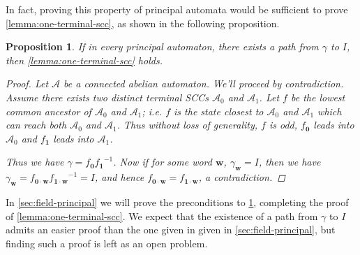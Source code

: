 \documentclass[12pt, letterpaper]{article}
\newcommand{\A}{\mathcal A}
\newcommand{\ch}[1]{\mathbf{#1}}
\newcommand{\res}[2]{{{#1}_{\ch{#2}}}}
\newtheorem{prop}[thm]{Proposition}
\begin{document}
In fact, proving this property of principal automata would be sufficient to
prove \cref{lemma:one-terminal-scc}, as shown in the following proposition.
\begin{prop}\label{prop:path-exist-gamma-delta}
    If in every principal automaton, there exists a path from $\gamma$ to
    $I$, then \cref{lemma:one-terminal-scc} holds.
    \begin{proof}
        Let $\A$ be a connected abelian automaton. We'll proceed by
        contradiction. Assume there exists two distinct terminal SCCs
        $\A_0$ and $\A_1$. Let $f$ be the lowest common ancestor of
        $\A_0$ and $\A_1$; i.e. $f$ is the state closest to $\A_0$ and
        $\A_1$ which can reach both $\A_0$ and $\A_1$. Thus without
        loss of generality, $f$ is odd, $\res{f}{0}$ leads into $\A_0$ and
        $\res{f}{1}$ leads into $\A_1$.
        \begin{center}
        \end{center}
        Thus we have $\gamma = \res{f}{0} \res{f}{1}^{-1}$.  Now if for some
        word $\ch{w}$, $\res{\gamma}{w} = I$, then we have $
        \res{\gamma}{w} = \res{f}{0 \cdot w} \res{f}{1 \cdot w}^{-1} = I$, and
        hence $\res{f}{0 \cdot w} = \res{f}{1 \cdot w}$, a contradiction.
    \end{proof}
\end{prop}

In \cref{sec:field-principal} we will prove the preconditions to
\cref{prop:path-exist-gamma-delta}, completing the proof of
\cref{lemma:one-terminal-scc}. We expect that the existence of a path from
$\gamma$ to $I$ admits an easier proof than the one given in given in
\cref{sec:field-principal}, but finding such a proof is left as an open
problem.
\end{document}
